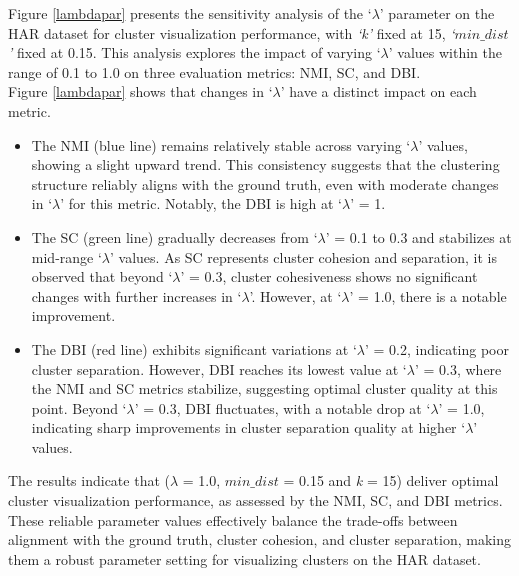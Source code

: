 Figure \ref{lambdapar} presents the sensitivity analysis of the `\textit{$\lambda$}' parameter on the HAR dataset for cluster visualization performance, with \textit{`k'} fixed at 15, \textit{`$min\_dist$'} fixed at 0.15. This analysis explores the impact of varying `\textit{$\lambda$}' values within the range of 0.1 to 1.0 on three evaluation metrics: NMI, SC, and DBI. \\
Figure \ref{lambdapar} shows that changes in `\textit{$\lambda$}' have a distinct impact on each metric.


\begin{itemize}
    \item The NMI (blue line) remains relatively stable across varying `\textit{$\lambda$}' values, showing a slight upward trend. This consistency suggests that the clustering structure reliably aligns with the ground truth, even with moderate changes in `\textit{$\lambda$}' for this metric. Notably, the DBI is high at `\textit{$\lambda$}' = 1. 
    \item The SC (green line) gradually decreases from `\textit{$\lambda$}' = 0.1 to 0.3 and stabilizes at mid-range `\textit{$\lambda$}' values. As SC represents cluster cohesion and separation, it is observed that beyond `\textit{$\lambda$}' = 0.3, cluster cohesiveness shows no significant changes with further increases in `\textit{$\lambda$}'. However, at `\textit{$\lambda$}' = 1.0, there is a notable improvement.
    \item The DBI (red line) exhibits significant variations at `\textit{$\lambda$}' = 0.2, indicating poor cluster separation. However, DBI reaches its lowest value at `\textit{$\lambda$}' = 0.3, where the NMI and SC metrics stabilize, suggesting optimal cluster quality at this point. Beyond `\textit{$\lambda$}' = 0.3, DBI fluctuates, with a notable drop at `\textit{$\lambda$}' = 1.0, indicating sharp improvements in cluster separation quality at higher `\textit{$\lambda$}' values.
\end{itemize}


The results indicate that (\textit{$\lambda$} = 1.0, \textit{$min\_dist$} = 0.15 and \textit{k} = 15) deliver optimal cluster visualization performance, as assessed by the NMI, SC, and DBI metrics. These reliable parameter values effectively balance the trade-offs between alignment with the ground truth, cluster cohesion, and cluster separation, making them a robust parameter setting for visualizing clusters on the HAR dataset.




